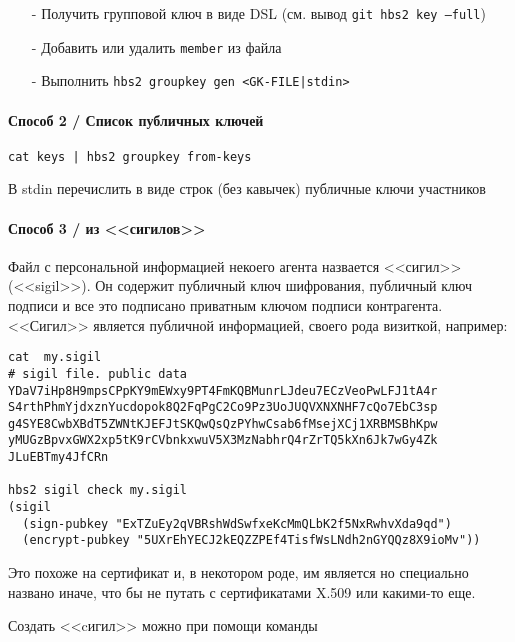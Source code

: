 \documentclass[11pt,a4paper]{article}
\begin{document}
\begin{itemize}
  \item[-] Получить групповой ключ в виде DSL (см. вывод \texttt{git hbs2 key --full})
  \item[-] Добавить или удалить \texttt{member} из файла
  \item[-] Выполнить \texttt{hbs2 groupkey gen <GK-FILE|stdin>}
\end{itemize}

\paragraph{Способ 2 / Список публичных ключей}

\begin{verbatim}
cat keys | hbs2 groupkey from-keys
\end{verbatim}

В stdin перечислить в виде строк (без кавычек) публичные ключи участников

\pagebreak

\paragraph{Способ 3 / из <<сигилов>>}

Файл с персональной информацией некоего агента назвается <<сигил>> (<<sigil>>).
Он содержит публичный ключ шифрования, публичный ключ подписи и все это подписано
приватным ключом подписи контрагента. <<Сигил>> является публичной информацией,
своего рода визиткой, например:

\begin{verbatim}
cat  my.sigil
# sigil file. public data
YDaV7iHp8H9mpsCPpKY9mEWxy9PT4FmKQBMunrLJdeu7ECzVeoPwLFJ1tA4r
S4rthPhmYjdxznYucdopok8Q2FqPgC2Co9Pz3UoJUQVXNXNHF7cQo7EbC3sp
g4SYE8CwbXBdT5ZWNtKJEFJtSKQwQsQzPYhwCsab6fMsejXCj1XRBMSBhKpw
yMUGzBpvxGWX2xp5tK9rCVbnkxwuV5X3MzNabhrQ4rZrTQ5kXn6Jk7wGy4Zk
JLuEBTmy4JfCRn

hbs2 sigil check my.sigil
(sigil
  (sign-pubkey "ExTZuEy2qVBRshWdSwfxeKcMmQLbK2f5NxRwhvXda9qd")
  (encrypt-pubkey "5UXrEhYECJ2kEQZZPEf4TisfWsLNdh2nGYQQz8X9ioMv"))

\end{verbatim}

Это похоже на сертификат и, в некотором роде, им является но специально названо иначе, что бы не
путать с сертификатами X.509 или какими-то еще.

Создать <<cигил>> можно при помощи команды
\end{document}
